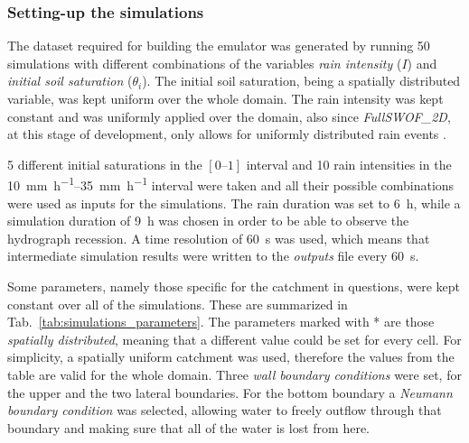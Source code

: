 \subsubsection{Setting-up the simulations}
The dataset required for building the emulator was generated by running \num{50} simulations with different combinations of the variables \emph{rain intensity} ($I$) and \emph{initial soil saturation} ($\theta_i$).
The initial soil saturation, being a spatially distributed variable, was kept uniform over the whole domain.
The rain intensity was kept constant and was uniformly applied over the domain, also since \textit{FullSWOF\_2D}, at this stage of development, only allows for uniformly distributed rain events \autocite{laguerre_documentation_2016}.

\num{5} different initial saturations in the $[\numrange{0}{1}]$ interval and \num{10} rain intensities in the \SIrange{10}{35}{\milli\metre\per\hour} interval were taken and all their possible combinations were used as inputs for the simulations.
The rain duration was set to \SI{6}{\hour}, while a simulation duration of \SI{9}{\hour} was chosen in order to be able to observe the hydrograph recession. A time resolution of \SI{60}{\second} was used, which means that intermediate simulation results were written to the \emph{outputs} file every \SI{60}{\second}.

Some parameters, namely those specific for the catchment in questions, were kept constant over all of the simulations.
These are summarized in Tab.~\ref{tab:simulations_parameters}.
The parameters marked with * are those \emph{spatially distributed}, meaning that a different value could be set for every cell.
For simplicity, a spatially uniform catchment was used, therefore the values from the table are valid for the whole domain.
Three \textit{wall boundary conditions} were set, for the upper and the two lateral boundaries.
For the bottom boundary a \textit{Neumann boundary condition} was selected, allowing water to freely outflow through that boundary and making sure that all of the water is lost from here.


